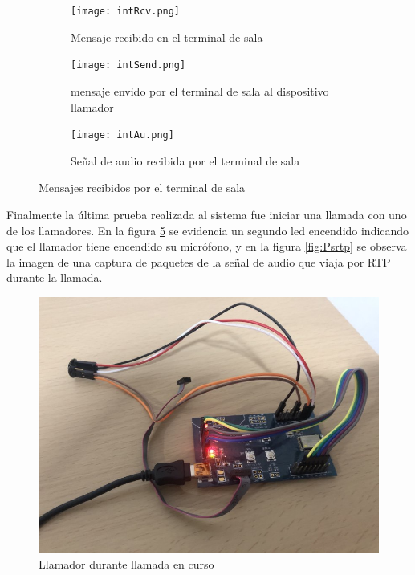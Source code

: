 \begin{figure}[htpb]
	\centering
   	\begin{subfigure}[b]{1\textwidth}
   		\centering
      	\texttt{[image: intRcv.png]}
      	\caption{Mensaje recibido en el terminal de sala}
      	\label{fig:PmrcvA}
   	\end{subfigure}%
   	\newline
   	\begin{subfigure}[b]{1\textwidth}
   		\centering
      	\texttt{[image: intSend.png]}
      	\caption{mensaje envido por el terminal de sala al dispositivo llamador}
      	\label{fig:PmrcvB}
   	\end{subfigure}%
   	\newline
   	\begin{subfigure}[b]{1\textwidth}
   		\centering
      	\texttt{[image: intAu.png]}
      	\caption{Señal de audio recibida por el terminal de sala}
      	\label{fig:PmrcvC}
   	\end{subfigure}%
	\caption{Mensajes recibidos por el terminal de sala}
	\label{fig:Pmrcv}
\end{figure}

Finalmente la última prueba realizada al sistema fue iniciar una llamada con uno de los llamadores. En la figura \ref{fig:Pmicon} se evidencia un segundo led encendido indicando que el llamador tiene encendido su micrófono, y en la figura \ref{fig:Psrtp} se observa la imagen de una captura de paquetes de la señal de audio que viaja por RTP durante la llamada.

\begin{figure}[htpb]
	\centering
	\includegraphics[scale=0.45]{./Figures/callCtrue.jpeg}	
	\caption{Llamador durante llamada en curso}
	\label{fig:Pmicon}
\end{figure}

